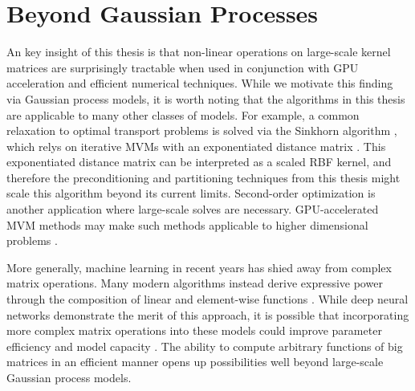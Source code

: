 \section{Beyond Gaussian Processes}

An key insight of this thesis is that non-linear operations on large-scale kernel matrices are surprisingly tractable when used in conjunction with GPU acceleration and efficient numerical techniques.
While we motivate this finding via Gaussian process models, it is worth noting that the algorithms in this thesis are applicable to many other classes of models.
For example, a common relaxation to optimal transport problems is solved via the Sinkhorn algorithm \cite{cuturi2013sinkhorn}, which relys on iterative MVMs with an exponentiated distance matrix \cite{altschuler2019massively}.
This exponentiated distance matrix can be interpreted as a scaled RBF kernel, and therefore the preconditioning and partitioning techniques from this thesis might scale this algorithm beyond its current limits.
Second-order optimization is another application where large-scale solves are necessary.
GPU-accelerated MVM methods may make such methods applicable to higher dimensional problems \cite{koh2017understanding}.

More generally, machine learning in recent years has shied away from complex matrix operations.
Many modern algorithms instead derive expressive power through the composition of linear and element-wise functions \cite{goodfellow2016deep}.
While deep neural networks demonstrate the merit of this approach, it is possible that incorporating more complex matrix operations into these models could improve parameter efficiency and model capacity \cite{jankowiak2020deep}.
The ability to compute arbitrary functions of big matrices in an efficient manner opens up possibilities well beyond large-scale Gaussian process models.


